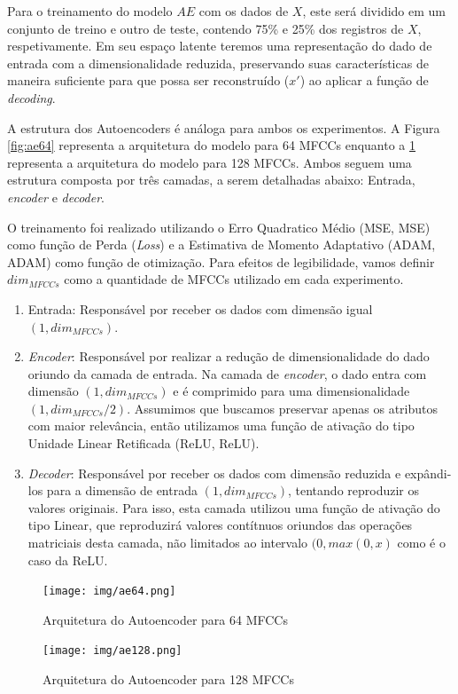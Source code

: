 Para o treinamento do modelo $AE$ com os dados de $X$, este será dividido em um conjunto de treino e outro de teste, contendo 75\% e 25\% dos registros de $X$, respetivamente. Em seu espaço latente teremos uma representação do dado de entrada com a dimensionalidade reduzida, preservando suas características de maneira suficiente para que possa ser reconstruído ($x'$) ao aplicar a função de \textit{decoding}.

A estrutura dos Autoencoders é análoga para ambos os experimentos. A Figura \ref{fig:ae64} representa a arquitetura do modelo para 64 \acrshort{MFCC}s enquanto a \ref{fig:ae128} representa a arquitetura do modelo para 128 \acrshort{MFCC}s. Ambos seguem uma estrutura composta por três camadas, a serem detalhadas abaixo: Entrada, \textit{encoder} e \textit{decoder}.

O treinamento foi realizado utilizando o Erro Quadratico Médio (\acrlong{MSE}, \acrshort{MSE}) como função de Perda (\textit{Loss}) e a Estimativa de Momento Adaptativo (\acrlong{ADAM}, \acrshort{ADAM}) como função de otimização. Para efeitos de legibilidade, vamos definir $dim_{MFCCs}$ como a quantidade de \acrshort{MFCC}s utilizado em cada experimento.

\begin{enumerate}
    \item Entrada: Responsável por receber os dados com dimensão igual $(1, dim_{MFCCs})$.
    \item \textit{Encoder}: Responsável por realizar a redução de dimensionalidade do dado oriundo da camada de entrada. Na camada de \textit{encoder}, o dado entra com dimensão $(1, dim_{MFCCs})$ e é comprimido para uma dimensionalidade $(1, dim_{MFCCs}/2)$. Assumimos que buscamos preservar apenas os atributos com maior relevância, então utilizamos uma função de ativação do tipo Unidade Linear Retificada (\acrlong{ReLU}, \acrshort{ReLU}).
    \item \textit{Decoder}: Responsável por receber os dados com dimensão reduzida e expândi-los para a dimensão de entrada $(1, dim_{MFCCs})$, tentando reproduzir os valores originais. Para isso, esta camada utilizou uma função de ativação do tipo Linear, que reproduzirá valores contítnuos oriundos das operações matriciais desta camada, não limitados ao intervalo $(0, max(0, x)$ como é o caso da \acrshort{ReLU}.
\end{enumerate}

\begin{figure}[h]
    \centering
    \begin{minipage}[b]{0.4\linewidth}
        \centering
        \texttt{[image: img/ae64.png]}
        \caption{\label{fig:ae64}Arquitetura do Autoencoder para 64 \acrshort{MFCC}s}
    \end{minipage}
    \begin{minipage}[b]{0.4\linewidth}
        \centering
        \texttt{[image: img/ae128.png]}
        \caption{\label{fig:ae128}Arquitetura do Autoencoder para 128 \acrshort{MFCC}s}
    \end{minipage}
\end{figure}


